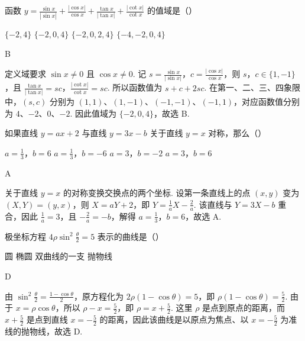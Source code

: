 \begin{problem}
函数 \(y=\frac{\sin x}{\left| \sin x \right|}+\frac{\left| \cos x \right|}{\cos x}+\frac{\tan x}{\left| \tan x \right|}+\frac{\left| \cot x \right|}{\cot x}\) 的值域是（\quad）

\choices
    {\(\{-2,4\}\)}
    {\(\{-2,0,4\}\)}
    {\(\{-2,0,2,4\}\)}
    {\(\{-4,-2,0,4\}\)}

\begin{answer}
B
\end{answer}

\begin{solution}
定义域要求 \(\sin x\neq0\) 且 \(\cos x\neq0\). 记 \(s=\frac{\sin x}{\lvert\sin x\rvert}\)，\(c=\frac{\lvert\cos x\rvert}{\cos x}\)，则 \(s\)，\(c\in\{1,-1\}\)，且 \(\frac{\tan x}{\lvert\tan x\rvert}=sc\)，\(\frac{\lvert\cot x\rvert}{\cot x}=sc\). 所以函数值为 \(s+c+2sc\). 在第一、二、三、四象限中，\((s,c)\) 分别为 \((1,1)\)、\((1,-1)\)、\((-1,-1)\)、\((-1,1)\)，对应函数值分别为 \(4\)、\(-2\)、\(0\)、\(-2\). 因此值域为 \(\{-2,0,4\}\)，故选 B.
\end{solution}
\end{problem}

\begin{problem}
如果直线 \(y=ax+2\) 与直线 \(y=3x-b\) 关于直线 \(y=x\) 对称，那么（\quad）

\choices
    {\(a=\frac{1}{3}\)，\(b=6\)}
    {\(a=\frac{1}{3}\)，\(b=-6\)}
    {\(a=3\)，\(b=-2\)}
    {\(a=3\)，\(b=6\)}

\begin{answer}
A
\end{answer}

\begin{solution}
关于直线 \(y=x\) 的对称变换交换点的两个坐标. 设第一条直线上的点 \((x,y)\) 变为 \((X,Y)=(y,x)\)，则 \(X=aY+2\)，即 \(Y=\frac{1}{a}X-\frac{2}{a}\). 该直线与 \(Y=3X-b\) 重合，因此 \(\frac{1}{a}=3\)，且 \(-\frac{2}{a}=-b\)，解得 \(a=\frac{1}{3}\)，\(b=6\)，故选 A.
\end{solution}
\end{problem}

\begin{problem}
极坐标方程 \(4\rho\sin^2\frac{\theta}{2}=5\) 表示的曲线是（\quad）

\choices
    {圆}
    {椭圆}
    {双曲线的一支}
    {抛物线}

\begin{answer}
D
\end{answer}

\begin{solution}
由 \(\sin^2\frac{\theta}{2}=\frac{1-\cos\theta}{2}\)，原方程化为 \(2\rho(1-\cos\theta)=5\)，即 \(\rho(1-\cos\theta)=\frac{5}{2}\). 由于 \(x=\rho\cos\theta\)，所以 \(\rho-x=\frac{5}{2}\)，即 \(\rho=x+\frac{5}{2}\). 这里 \(\rho\) 是点到原点的距离，而 \(x+\frac{5}{2}\) 是点到直线 \(x=-\frac{5}{2}\) 的距离，因此该曲线是以原点为焦点、以 \(x=-\frac{5}{2}\) 为准线的抛物线，故选 D.
\end{solution}
\end{problem}

